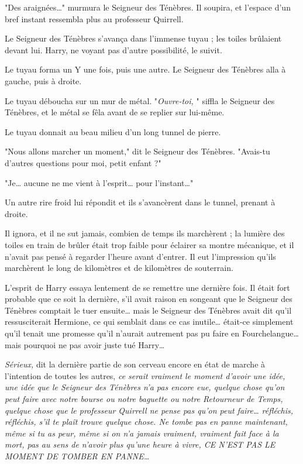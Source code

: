 "Des araignées…" murmura le Seigneur des Ténèbres. Il soupira, et l'espace d'un bref instant ressembla plus au professeur Quirrell.

Le Seigneur des Ténèbres s'avança dans l'immense tuyau ; les toiles brûlaient devant lui. Harry, ne voyant pas d'autre possibilité, le suivit.

Le tuyau forma un Y une fois, puis une autre. Le Seigneur des Ténèbres alla à gauche, puis à droite.

Le tuyau déboucha sur un mur de métal. "\emph{Ouvre-toi,} " siffla le Seigneur des Ténèbres, et le métal se fêla avant de se replier sur lui-même.

Le tuyau donnait au beau milieu d'un long tunnel de pierre.

"Nous allons marcher un moment," dit le Seigneur des Ténèbres. "Avais-tu d'autres questions pour moi, petit enfant ?"

"Je… aucune ne me vient à l'esprit… pour l'instant…"

Un autre rire froid lui répondit et ils s'avancèrent dans le tunnel, prenant à droite.

Il ignora, et il ne sut jamais, combien de temps ils marchèrent ; la lumière des toiles en train de brûler était trop faible pour éclairer sa montre mécanique, et il n'avait pas pensé à regarder l'heure avant d'entrer. Il eut l'impression qu'ils marchèrent le long de kilomètres et de kilomètres de souterrain.

L'esprit de Harry essaya lentement de se remettre une dernière fois. Il était fort probable que ce soit la dernière, s'il avait raison en songeant que le Seigneur des Ténèbres comptait le tuer ensuite… mais le Seigneur des Ténèbres avait dit qu'il ressusciterait Hermione, ce qui semblait dans ce cas inutile… était-ce simplement qu'il tenait une promesse qu'il n'aurait autrement pas pu faire en Fourchelangue… mais pourquoi ne pas avoir juste tué Harry…

\emph{Sérieux,}  dit la dernière partie de son cerveau encore en état de marche à l'intention de toutes les autres, \emph{ce serait vraiment le moment d'avoir une idée, une idée que le Seigneur des Ténèbres n'a pas encore eue, quelque chose qu'on peut faire avec notre bourse ou notre baguette ou notre Retourneur de Temps, quelque chose que le professeur Quirrell ne pense pas qu'on peut faire… réfléchis, réfléchis, s'il te plaît trouve quelque chose. Ne tombe pas en panne maintenant, même si tu as peur, même si on n'a jamais vraiment, vraiment fait face à la mort, pas au sens de n'avoir plus qu'une heure à vivre, CE N'EST PAS LE MOMENT DE TOMBER EN PANNE…} 

